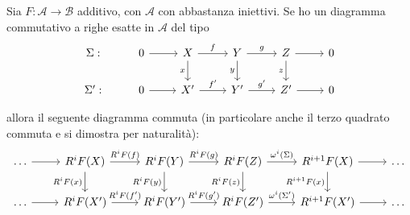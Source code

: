 \begin{remark}{}
    Sia \(F : \mathcal{A} \to \mathcal{B}\) additivo, con \(\mathcal{A}\) con
    abbastanza iniettivi. Se ho un diagramma commutativo a righe esatte in
    \(\mathcal{A}\) del tipo
\[ \begin{tikzcd}
	{\Sigma:} & 0 & X & Y & Z & 0 \\
	{\Sigma^\prime:} & 0 & {X^\prime} & {Y^\prime} & {Z^\prime} & 0
	\arrow[from=1-2, to=1-3]
	\arrow["f", from=1-3, to=1-4]
	\arrow["x"', from=1-3, to=2-3]
	\arrow["g", from=1-4, to=1-5]
	\arrow["y"', from=1-4, to=2-4]
	\arrow[from=1-5, to=1-6]
	\arrow["z"', from=1-5, to=2-5]
	\arrow[from=2-2, to=2-3]
	\arrow["{f^\prime}", from=2-3, to=2-4]
	\arrow["{g^\prime}", from=2-4, to=2-5]
	\arrow[from=2-5, to=2-6]
\end{tikzcd} \]

allora il seguente diagramma commuta (in particolare anche il terzo quadrato
commuta e si dimostra per naturalità):
\[ \begin{tikzcd}
	\dots& R^{i}F{(X)} & R^{i}F{(Y)} & R^{i}F{(Z)} & R^{i+1}F{(X)} & \dots \\
    \dots& R^{i}F{(X^{\prime})} & R^{i}F{(Y^{\prime})} & R^{i}F{(Z^{\prime})} &
         R^{i+1}F{(X^{\prime})}& \dots
	\arrow[from=1-1, to=1-2]
	\arrow["R^{i}F{(f)}", from=1-2, to=1-3]
	\arrow["R^{i}F{(f^{\prime})}", from=2-2, to=2-3]
	\arrow["R^{i}F{(g)}", from=1-3, to=1-4]
	\arrow["R^{i}F{(x)}"', from=1-2, to=2-2]
	\arrow["R^{i}F{(y)}"', from=1-3, to=2-3]
	\arrow["\omega^{i}{(\Sigma)}", from=1-4, to=1-5]
	\arrow["R^{i}F{(z)}"', from=1-4, to=2-4]
	\arrow[from=1-5, to=1-6]
	\arrow["R^{i+1}F{(x)}"', from=1-5, to=2-5]
	\arrow[from=2-1, to=2-2]
	\arrow["R^{i}F{(g^{\prime})}", from=2-3, to=2-4]
	\arrow["\omega^{i}{(\Sigma^{\prime})}", from=2-4, to=2-5]
	\arrow[from=2-5, to=2-6]
\end{tikzcd} \]


\end{remark}
